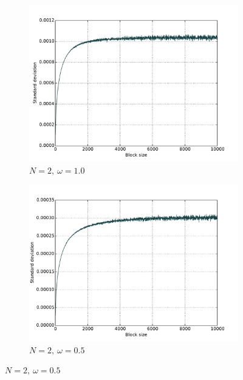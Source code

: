 \documentclass[english, a4paper]{article}
\begin{document}
		\begin{figure}[H]
			
			\begin{subfigure}{0.5\textwidth}
				\includegraphics[scale=0.43]{figures/blocking/filipN2w100.pdf}
				\caption{$N=2,\:\omega=1.0$}
				\label{fig:blockingN2w100}
			\end{subfigure}
			\begin{subfigure}{0.5\textwidth}
				\includegraphics[scale=0.43]{figures/blocking/filipN2w50.pdf}
				\caption{$N=2,\:\omega=0.5$}
				\label{fig:blockingN2w50}
			\end{subfigure}
			
			\vspace{1mm}
			

\end{figure}
\end{document}
